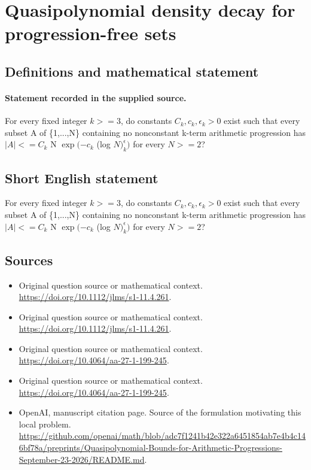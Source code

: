\documentclass[11pt]{article}
\begin{document}
\section*{Quasipolynomial density decay for progression-free sets}\label{statement}
\subsection{Definitions and mathematical statement}
\paragraph{Statement recorded in the supplied source.}
For every fixed integer $k>=3$, do constants $C_k,c_k,\epsilon _k>0$ exist such that every subset A of \{1,...,N\} containing no nonconstant k-term arithmetic progression has $|A|<=C_k$ N $\exp (-c_k$ (log $N)^\epsilon _k)$ for every $N>=2$?
\subsection{Short English statement}
For every fixed integer $k>=3$, do constants $C_k,c_k,\epsilon _k>0$ exist such that every subset A of \{1,...,N\} containing no nonconstant k-term arithmetic progression has $|A|<=C_k$ N $\exp (-c_k$ (log $N)^\epsilon _k)$ for every $N>=2$?
\subsection{Sources}
\begin{itemize}
\item[S1] Original question source or mathematical context.
\url{https://doi.org/10.1112/jlms/s1-11.4.261}.
\item[S2] Original question source or mathematical context.
\url{https://doi.org/10.1112/jlms/s1-11.4.261}.
\item[S3] Original question source or mathematical context.
\url{https://doi.org/10.4064/aa-27-1-199-245}.
\item[S4] Original question source or mathematical context.
\url{https://doi.org/10.4064/aa-27-1-199-245}.
\item[S5] OpenAI, manuscript citation page. Source of the formulation motivating this local problem.
\url{https://github.com/openai/math/blob/adc7f1241b42e322a6451854ab7e4b4c146bf78a/preprints/Quasipolynomial-Bounds-for-Arithmetic-Progressions-September-23-2026/README.md}.
\end{itemize}
\end{document}
